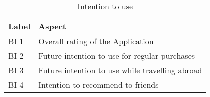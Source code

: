 \begin{table}[H]
\centering
\begin{tabular}{p{1cm} p{14cm}}

\toprule
Label & Aspect\\
\midrule
BI 1    &   Overall rating of the Application \\
BI 2	&   Future intention to use for regular purchases \\
BI 3	&   Future intention to use while  travelling abroad \\
BI 4	&   Intention to recommend to friends \\
\bottomrule

\end{tabular}
\caption{Intention to use}
\label{tab:intention-to-user}
\end{table}